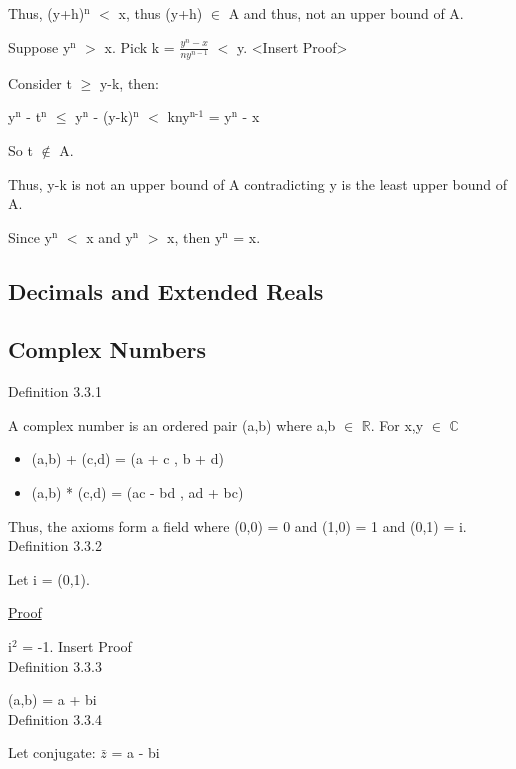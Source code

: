 Thus, (y+h)$^\text{n}$ $<$ x, thus (y+h) $\in$ A and thus, not an upper bound of A.

Suppose y$^\text{n}$ $>$ x. Pick k = $\frac{y^n - x}{ny^{n-1}}$ $<$ y. <Insert Proof>

Consider t $ \geq $  y-k, then:

\qquad y$^\text{n}$ - t$^\text{n}$ $ \leq $  y$^\text{n}$ - (y-k)$^\text{n}$ $<$
	kny$^\text{n-1}$ = y$^\text{n}$ - x

So t $\not \in$ A.

Thus, y-k is not an upper bound of A contradicting y is the least upper bound of A.

Since y$^\text{n}$ $<$ x and y$^\text{n}$ $>$ x, then y$^\text{n}$ = x. 

\subsection{Decimals and Extended Reals}

\subsection{Complex Numbers}

	{ \color{blue} Definition 3.3.1 } 
	
	\qquad A complex number is an ordered pair (a,b) where a,b $\in$ $ \mathbb{R} $.
	For x,y $\in$ $\mathbb{C}$
	\begin{itemize}[leftmargin=2cm]
		\item (a,b) + (c,d) = (a + c , b + d)
		\item (a,b) * (c,d) = (ac - bd , ad + bc)
	\end{itemize}

	Thus, the axioms form a field where (0,0) = 0 and (1,0) = 1 and (0,1) = i. \\

	{ \color{blue} Definition 3.3.2 } 
	
	\qquad Let i = (0,1).

	{ \color{magenta} \underline{Proof} } 
	
	i$^\text{2}$ = -1. {\color{red} Insert Proof} \\

	{ \color{blue} Definition 3.3.3 } 
	
	\qquad (a,b) = a + bi \\

	{ \color{blue} Definition 3.3.4 }
	
	\qquad Let conjugate: $\bar{z}$ = a - bi

